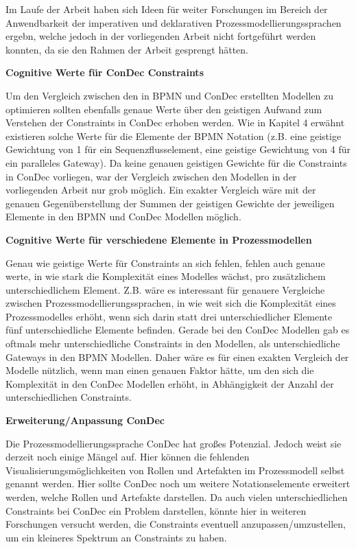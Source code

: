 Im Laufe der Arbeit haben sich Ideen für weiter Forschungen im Bereich der Anwendbarkeit der imperativen und deklarativen Prozessmodellierungssprachen ergebn, welche jedoch in der vorliegenden Arbeit nicht fortgeführt werden konnten, da sie den Rahmen der Arbeit gesprengt hätten.\newline

\textbf{Cognitive Werte für ConDec Constraints}

Um den Vergleich zwischen den in BPMN und ConDec erstellten Modellen zu optimieren sollten ebenfalls genaue Werte über den geistigen Aufwand zum Verstehen der Constraints in ConDec erhoben werden. Wie in Kapitel 4 erwähnt existieren solche Werte für die Elemente der BPMN Notation (z.B. eine geistige Gewichtung von 1 für ein Sequenzflusselement, eine geistige Gewichtung von 4 für ein paralleles Gateway). Da keine genauen geistigen Gewichte für die Constraints in ConDec vorliegen, war der Vergleich zwischen den Modellen in der vorliegenden Arbeit nur grob möglich. Ein exakter Vergleich wäre mit der genauen Gegenüberstellung der Summen der geistigen Gewichte der jeweiligen Elemente in den BPMN und ConDec Modellen möglich.\newline

\textbf{Cognitive Werte für verschiedene Elemente in Prozessmodellen}

Genau wie geistige Werte für Constraints an sich fehlen, fehlen auch genaue werte, in wie stark die Komplexität eines Modelles wächst, pro zusätzlichem unterschiedlichem Element. Z.B. wäre es interessant für genauere Vergleiche zwischen Prozessmodellierungssprachen, in wie weit sich die Komplexität eines Prozessmodelles erhöht, wenn sich darin statt drei unterschiedlicher Elemente fünf unterschiedliche Elemente befinden. Gerade bei den ConDec Modellen gab es oftmals mehr unterschiedliche Constraints in den Modellen, als unterschiedliche Gateways in den BPMN Modellen. Daher wäre es für einen exakten Vergleich der Modelle nützlich, wenn man einen genauen Faktor hätte, um den sich die Komplexität in den ConDec Modellen erhöht, in Abhängigkeit der Anzahl der unterschiedlichen Constraints.  


\textbf{Erweiterung/Anpassung ConDec}

Die Prozessmodellierungssprache ConDec hat großes Potenzial. Jedoch weist sie derzeit noch einige Mängel auf. Hier können die fehlenden Visualisierungsmöglichkeiten von Rollen und Artefakten im Prozessmodell selbst genannt werden. Hier sollte ConDec noch um weitere Notationselemente erweitert werden, welche Rollen und Artefakte darstellen.\newline
Da auch vielen unterschiedlichen Constraints bei ConDec ein Problem darstellen, könnte hier in weiteren Forschungen versucht werden, die Constraints eventuell anzupassen/umzustellen, um ein kleineres Spektrum an Constraints zu haben.\newline

